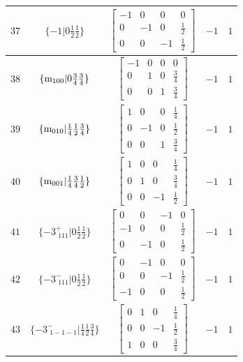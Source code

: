 \documentclass[fleqn,8pt]{jsarticle}
\begin{document}
\begin{longtable}{ccccc}
$ 37 $ & $ \{-1|0 \frac{1}{2} \frac{1}{2}\} $ & $ \begin{bmatrix} -1 & 0 & 0 & 0 \\ 0 & -1 & 0 & \frac{1}{2} \\ 0 & 0 & -1 & \frac{1}{2} \end{bmatrix} $ & $ -1 $ & $ 1 $ \\ \hline
$ 38 $ & $ \{{\rm m}_{100}|0 \frac{3}{4} \frac{3}{4}\} $ & $ \begin{bmatrix} -1 & 0 & 0 & 0 \\ 0 & 1 & 0 & \frac{3}{4} \\ 0 & 0 & 1 & \frac{3}{4} \end{bmatrix} $ & $ -1 $ & $ 1 $ \\ \hline
$ 39 $ & $ \{{\rm m}_{010}|\frac{1}{4} \frac{1}{2} \frac{3}{4}\} $ & $ \begin{bmatrix} 1 & 0 & 0 & \frac{1}{4} \\ 0 & -1 & 0 & \frac{1}{2} \\ 0 & 0 & 1 & \frac{3}{4} \end{bmatrix} $ & $ -1 $ & $ 1 $ \\ \hline
$ 40 $ & $ \{{\rm m}_{001}|\frac{1}{4} \frac{3}{4} \frac{1}{2}\} $ & $ \begin{bmatrix} 1 & 0 & 0 & \frac{1}{4} \\ 0 & 1 & 0 & \frac{3}{4} \\ 0 & 0 & -1 & \frac{1}{2} \end{bmatrix} $ & $ -1 $ & $ 1 $ \\ \hline
$ 41 $ & $ \{-3^{+}_{\,\,111}|0 \frac{1}{2} \frac{1}{2}\} $ & $ \begin{bmatrix} 0 & 0 & -1 & 0 \\ -1 & 0 & 0 & \frac{1}{2} \\ 0 & -1 & 0 & \frac{1}{2} \end{bmatrix} $ & $ -1 $ & $ 1 $ \\ \hline
$ 42 $ & $ \{-3^{-}_{\,\,111}|0 \frac{1}{2} \frac{1}{2}\} $ & $ \begin{bmatrix} 0 & -1 & 0 & 0 \\ 0 & 0 & -1 & \frac{1}{2} \\ -1 & 0 & 0 & \frac{1}{2} \end{bmatrix} $ & $ -1 $ & $ 1 $ \\ \hline
$ 43 $ & $ \{-3^{-}_{\,\,1-1-1}|\frac{1}{4} \frac{1}{2} \frac{3}{4}\} $ & $ \begin{bmatrix} 0 & 1 & 0 & \frac{1}{4} \\ 0 & 0 & -1 & \frac{1}{2} \\ 1 & 0 & 0 & \frac{3}{4} \end{bmatrix} $ & $ -1 $ & $ 1 $ \\ \hline

\end{longtable}
\end{document}
